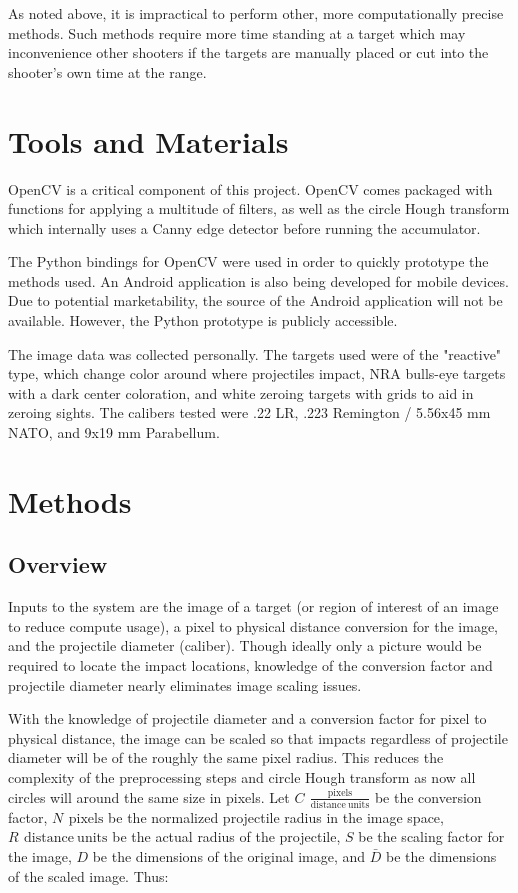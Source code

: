 \documentclass{article}
\newcommand{\unit}[1]{\ensuremath{\, \mathrm{#1}}}
\begin{document}
As noted above, it is impractical to perform other, more computationally precise methods.
Such methods require more time standing at a target which may inconvenience other shooters
if the targets are manually placed or cut into the shooter's own time at the range.

\section{Tools and Materials}
\label{sec:tools}
OpenCV is a critical component of this project. OpenCV comes packaged with functions for
applying a multitude of filters, as well as the circle Hough transform which internally uses a
Canny edge detector before running the accumulator.

The Python bindings for OpenCV were used in order to quickly prototype the methods used.
An Android application is also being developed for mobile devices.
Due to potential marketability, the source of the Android application will not be available.
However, the Python prototype is publicly accessible.

The image data was collected personally. The targets used were of the "reactive" type, which
change color around where projectiles impact, NRA bulls-eye targets with a dark center coloration, and
white zeroing targets with grids to aid in zeroing sights. The calibers tested were .22 LR,
.223 Remington / 5.56x45 mm NATO, and 9x19 mm Parabellum.

\section{Methods}
\label{sec:methods}

\subsection{Overview}
\label{ssec:overview}
Inputs to the system are the image of a target (or region of interest of an image to reduce
compute usage), a pixel to physical distance conversion for the image,
and the projectile diameter (caliber). Though ideally only a picture would
be required to locate the impact locations, knowledge of the conversion factor and projectile
diameter nearly eliminates image scaling issues.

With the knowledge of projectile diameter and a conversion factor for pixel to physical distance,
the image can be scaled so that impacts regardless of projectile diameter will be of the roughly
the same pixel radius. This reduces the complexity of the preprocessing steps and circle Hough
transform as now all circles will around the same size in pixels.
Let \(C\ \unit{\frac{pixels}{distance\ units}}\) be the conversion factor, \(N\ \unit{pixels}\)
be the normalized projectile radius in the image space, \(R\ \unit{distance\ units}\) be the 
actual radius of the projectile, \(S\) be the scaling factor for the image, \(D\) be 
the dimensions of the original image, and \(\bar{D}\) be the dimensions of the scaled image.
Thus:
\end{document}
